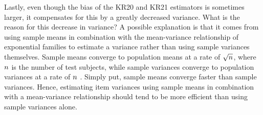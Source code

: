 \documentclass[12pt,epsfig]{article}
\newcommand{\changed}[1]{\textcolor{black}{#1}}
\newcommand{\numsubjects}{\changed{n}}%
\begin{document}

Lastly, even though the bias of the KR20 and KR21 estimators is sometimes larger, it compensates for this by a greatly decreased variance. What is the reason for this decrease in variance? A possible explanation is that it comes from using sample means in combination with the mean-variance relationship of exponential families to estimate a variance rather than using sample variances themselves. Sample means converge to population means at a rate of $\sqrt{\numsubjects}$, where $\numsubjects$ is the number of test subjects, while sample variances converge to population variances at a rate of $\numsubjects$ \citep{CasellaBerger}. Simply put, sample means converge faster than sample variances. Hence, estimating item variances using sample means in combination with a mean-variance relationship should tend to be more efficient than using sample variances alone.






\end{document}
